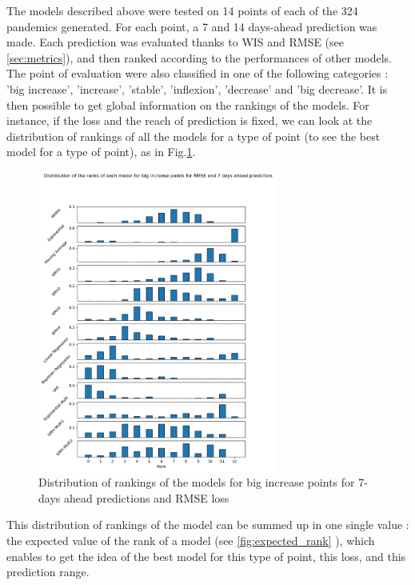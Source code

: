 The models described above were tested on 14 points of each of the 324 pandemics generated. 
For each point, a 7 and 14 days-ahead prediction was made. 
Each prediction was evaluated thanks to WIS and RMSE (see \ref{sec:metrics}), and then ranked according to the performances of other models.
The point of evaluation were also classified in one of the following categories : 'big increase', 'increase', 'stable', 'inflexion', 'decrease' and 'big decrease'. 
It is then possible to get global information on the rankings of the models. 
For instance, if the loss and the reach of prediction is fixed, we can look at the distribution of rankings of all the models for a type of point (to see the best model for a type of point), as in Fig.\ref{fig:rankings}.
\begin{figure}[h]
    \centering
    \includegraphics[width=0.7\textwidth]{figures/ranks_big_increase_RMSE_7.png}
    \caption{Distribution of rankings of the models for big increase points for 7-days ahead predictions and RMSE loss}
    \label{fig:rankings}
\end{figure}
This distribution of rankings of the model can be summed up in one single value : the expected value of the rank of a model (see \ref{fig:expected_rank} ), which enables to get the idea of the best model for this type of point, this loss, and this prediction range. 

